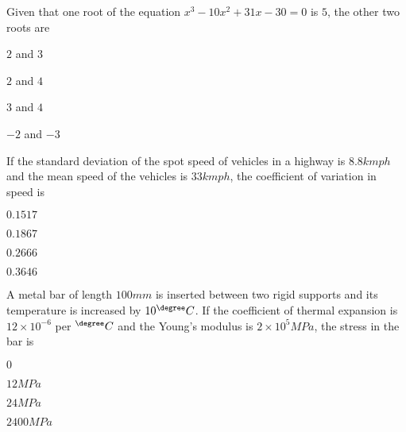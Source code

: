 \item Given that one root of the equation $x^3-10x^2+31x-30=0$ is $5$, the other two roots are

\hfill{}
\begin{enumerate}
\begin{multicols}{4}
\item $2$ and $3$
\item $2$ and $4$
\item $3$ and $4$
\item $-2$ and $-3$
\end{multicols}
\end{enumerate}

\item If the standard deviation of the spot speed of vehicles in a highway is $8.8kmph$ and the mean speed of the vehicles is $33kmph$, the coefficient of variation in speed is 

\hfill{}
\begin{enumerate}
\begin{multicols}{4}
\item $0.1517$
\item $0.1867$
\item $0.2666$
\item $0.3646$
\end{multicols}
\end{enumerate}

\item A metal bar of length $100mm$ is inserted between two rigid supports and its temperature is increased by $10^{\degree} C$. If the coefficient of thermal expansion is $12\times 10^{-6}$ per $^{\degree} C$ and the Young's modulus is $2\times 10^5 MPa$, the stress in the bar is

\hfill{}
\begin{enumerate}
\begin{multicols}{4}
\item $0$
\item $12MPa$
\item $24MPa$
\item $2400MPa$
\end{multicols}
\end{enumerate}

